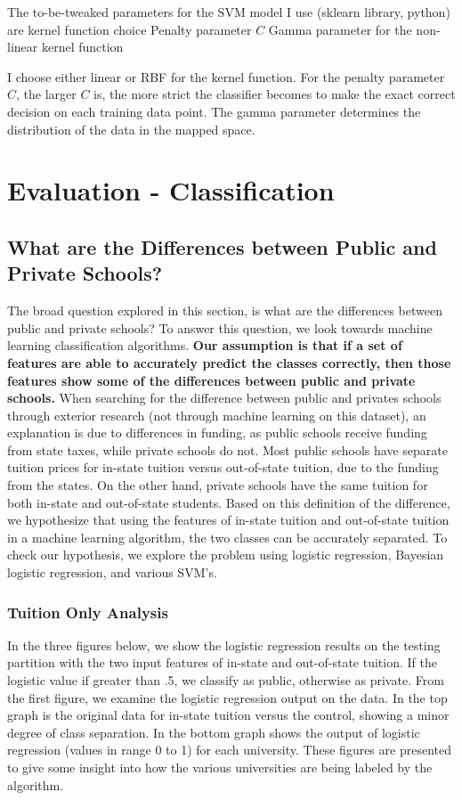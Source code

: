\documentclass[10pt]{article}
\begin{document}
The to-be-tweaked parameters for the SVM model I use (sklearn library, python) are 
kernel function choice
Penalty parameter $ C $
Gamma parameter for the non-linear kernel function

I choose either linear or RBF for the kernel function. For the penalty parameter $ C $, the larger $ C $ is, the more strict the classifier becomes to make the exact correct decision on each training data point. The gamma parameter determines the distribution of the data in the mapped space.
    
\section{Evaluation - Classification}

\subsection{What are the Differences between Public and Private Schools?}

The broad question explored in this section, is what are the differences between public and private schools? To answer this question, we look towards machine learning classification algorithms. \textbf{Our assumption is that if a set of features are able to accurately predict the classes correctly, then those features show some of the differences between public and private schools.} When searching for the difference between public and privates schools through exterior research (not through machine learning on this dataset), an explanation is due to differences in funding, as public schools receive funding from state taxes, while private schools do not. Most public schools have separate tuition prices for in-state tuition versus out-of-state tuition, due to the funding from the states. On the other hand, private schools have the same tuition for both in-state and out-of-state students. Based on this definition of the difference, we hypothesize that using the features of in-state tuition and out-of-state tuition in a machine learning algorithm, the two classes can be accurately separated. To check our hypothesis, we explore the problem using logistic regression, Bayesian logistic regression, and various SVM's.

\subsubsection{Tuition Only Analysis}

In the three figures below, we show the logistic regression results on the testing partition with the two input features of in-state and out-of-state tuition. If the logistic value if greater than .5, we classify as public, otherwise as private. From the first figure, we examine the logistic regression output on the data. In the top graph is the original data for in-state tuition versus the control, showing a minor degree of class separation. In the bottom graph shows the output of logistic regression (values in range 0 to 1) for each university. These figures are presented to give some insight into how the various universities are being labeled by the algorithm.
\end{document}
